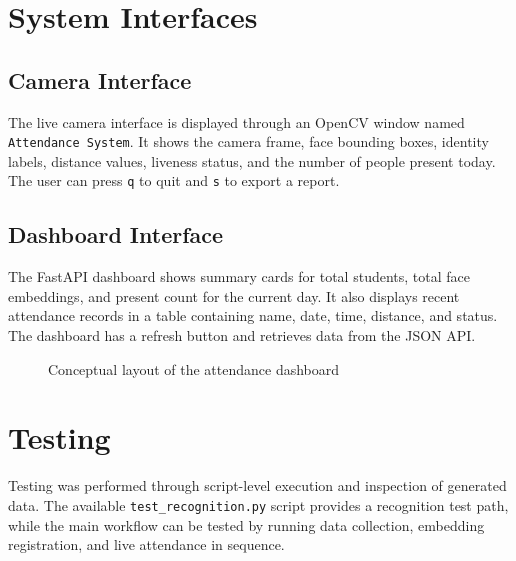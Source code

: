 \documentclass[12pt,a4paper]{report}
\newcommand{\JustifiedNormal}{\fontsize{12}{14}\selectfont\justifying\setlength{\parindent}{0pt}}
\begin{document}
\section{System Interfaces}
\JustifiedNormal
\subsection{Camera Interface}
\JustifiedNormal
The live camera interface is displayed through an OpenCV window named \texttt{Attendance System}. It shows the camera frame, face bounding boxes, identity labels, distance values, liveness status, and the number of people present today. The user can press \texttt{q} to quit and \texttt{s} to export a report.

\subsection{Dashboard Interface}
\JustifiedNormal
The FastAPI dashboard shows summary cards for total students, total face embeddings, and present count for the current day. It also displays recent attendance records in a table containing name, date, time, distance, and status. The dashboard has a refresh button and retrieves data from the JSON API.

\begin{figure}[H]
\centering
{}
\caption{Conceptual layout of the attendance dashboard}
\end{figure}

\section{Testing}
\JustifiedNormal
Testing was performed through script-level execution and inspection of generated data. The available \texttt{test\_recognition.py} script provides a recognition test path, while the main workflow can be tested by running data collection, embedding registration, and live attendance in sequence.
\end{document}
